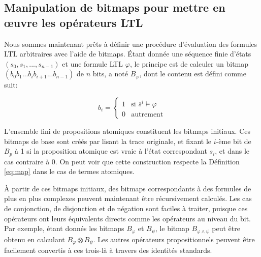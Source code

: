 \subsection{Manipulation de bitmaps pour mettre en \oe{}uvre les opérateurs LTL} %

Nous sommes maintenant prêts à définir une procédure d'évaluation des formules LTL arbitraires avec l'aide de bitmaps. Étant donnée une séquence finie d'états $(s_0, s_1, ..., s_{n - 1})$ et une formule LTL $\varphi$, le principe est de calculer un bitmap $(b_0b_1...b_ib_{i + 1}...b_{n - 1})$ de $n$ bits, a noté $B_\varphi$, dont le contenu est défini comme suit:

\begin{equation}\label{eq:map}
b_i = \begin{cases}
1 & \text{si $\overline{s}^i \models \varphi$} \\
0 & \text{autrement}
\end{cases}
\end{equation}

L'ensemble fini de propositions atomiques constituent les bitmaps initiaux. Ces bitmaps de base sont créés par lisant la trace originale, et fixant le $i$-ème bit de $B_p$ à 1 si la proposition atomique est vraie à l'état correspondant $s_i$, et dans le cas contraire à 0. On peut voir que cette construction respecte la Définition \ref{eq:map} dans le cas de termes atomiques.

À partir de ces bitmaps initiaux, des bitmaps correspondants à des formules de plus en plus complexes peuvent maintenant être récursivement calculés. Les cas de conjonction, de disjonction et de négation sont faciles à traiter, puisque ces opérateurs ont leurs équivalents directs comme les opérateurs au niveau du bit. Par exemple, étant donnés les bitmaps $B_\varphi$ et $B_\psi$, le bitmap $B_{\varphi \wedge \psi}$ peut être obtenu en calculant $B_\varphi \otimes B_\psi$. Les autres opérateurs propositionnels peuvent être facilement convertis à ces trois-là à travers des identités standards.

%

